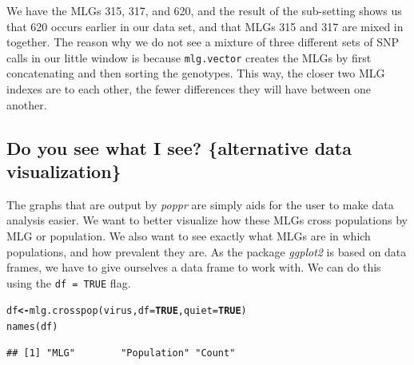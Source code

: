\documentclass[letterpaper]{article}\usepackage[]{graphicx}\usepackage[]{color}
\makeatletter
\newcommand{\hlnum}[1]{\textcolor[rgb]{0.502,0,0.502}{\textbf{#1}}}%
\newcommand{\hlstd}[1]{\textcolor[rgb]{0,0,0}{#1}}%
\newcommand{\hlkwb}[1]{\textcolor[rgb]{0.502,0.502,0.753}{\textbf{#1}}}%
\newcommand{\hlkwc}[1]{\textcolor[rgb]{0,0.502,0.753}{#1}}%
\newcommand{\hlkwd}[1]{\textcolor[rgb]{0,0.267,0.4}{#1}}%
\newenvironment{kframe}{%
 \def\at@end@of@kframe{}%
 \ifinner\ifhmode%
  \def\at@end@of@kframe{\end{minipage}}%
  \begin{minipage}{\columnwidth}%
 \fi\fi%
 \def\FrameCommand##1{\hskip\@totalleftmargin \hskip-\fboxsep
 \colorbox{shadecolor}{##1}\hskip-\fboxsep
     \hskip-\linewidth \hskip-\@totalleftmargin \hskip\columnwidth}%
 \MakeFramed {\advance\hsize-\width
   \@totalleftmargin\z@ \linewidth\hsize
   \@setminipage}}%
 {\par\unskip\endMakeFramed%
 \at@end@of@kframe}
\newenvironment{knitrout}{}{} %
\newcommand{\tab}{\hspace*{1em}}
\newcommand{\poppr}{\textit{poppr}}
\makeatother
\begin{document}
We have the MLGs 315, 317, and 620, and the result of the sub-setting shows us that 620 occurs earlier in our data set, and that MLGs 315 and 317 are mixed in together. The reason why we do not see a mixture of three different sets of SNP calls in our little window is because \texttt{mlg.vector} creates the MLGs by first concatenating and then sorting the genotypes. This way, the closer two MLG indexes are to each other, the fewer differences they will have between one another. 

%
\subsection{Do you see what I see? \{alternative data visualization\}}
\label{mlg:alt.vis}

\tab\tab The graphs that are output by \poppr{} are simply aids for the user to make data analysis easier. We want to better visualize how these MLGs cross populations by MLG or population. We also want to see exactly what MLGs are in which populations, and how prevalent they are. As the package \textit{ggplot2} is based on data frames, we have to give ourselves a data frame to work with. We can do this using the \texttt{df = TRUE} flag.
\begin{knitrout}\footnotesize
{}\color{fgcolor}\begin{kframe}
\begin{alltt}
\hlstd{df} \hlkwb{<-} \hlkwd{mlg.crosspop}\hlstd{(virus,} \hlkwc{df} \hlstd{=} \hlnum{TRUE}\hlstd{,} \hlkwc{quiet} \hlstd{=} \hlnum{TRUE}\hlstd{)}
\hlkwd{names}\hlstd{(df)}
\end{alltt}
\begin{verbatim}
## [1] "MLG"        "Population" "Count"
\end{verbatim}
\end{kframe}
\end{knitrout}
\end{document}
